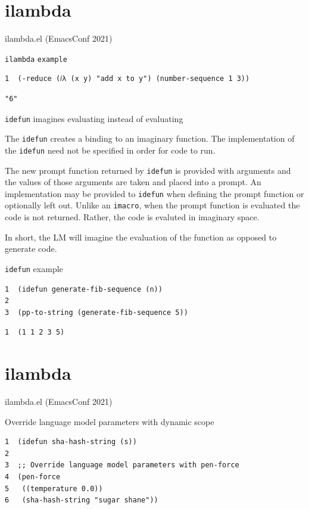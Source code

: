 \documentclass[presentation]{beamer}
\begin{document}
\section{ilambda}
\label{sec:org44c9bad}
\begin{frame}[label={sec:orga77398a},fragile]{ilambda.el (EmacsConf 2021)}
 \begin{block}{\texttt{ilambda} \texttt{example}}
{\tiny
\begin{verbatim}
1  (-reduce (𝑖λ (x y) "add x to y") (number-sequence 1 3))
\end{verbatim}
}

{\tiny
\begin{verbatim}
"6"
\end{verbatim}
}
\end{block}

\begin{block}{\texttt{idefun} imagines evaluating instead of evaluating}
{\tiny
The \texttt{idefun} creates a binding to an imaginary
function. The implementation of the \texttt{idefun}
need not be specified in order for code to
run.

The new prompt function returned by \texttt{idefun} is provided with arguments and the
values of those arguments are taken and placed
into a prompt. An implementation may be
provided to \texttt{idefun} when defining the prompt function or optionally left out.
Unlike an \texttt{imacro}, when the prompt function
is evaluated the code is not returned. Rather,
the code is evaluted in imaginary space.

In short, the LM will imagine the evaluation
of the function as opposed to generate code.
}
\end{block}

\begin{block}{\texttt{idefun} example}
{\tiny
\begin{verbatim}
1  (idefun generate-fib-sequence (n))
2  
3  (pp-to-string (generate-fib-sequence 5))
\end{verbatim}
}

{\tiny
\begin{verbatim}
1  (1 1 2 3 5)
\end{verbatim}
}
\end{block}
\end{frame}

\section{ilambda}
\label{sec:orgc007f51}
\begin{frame}[label={sec:org8780ad9},fragile]{ilambda.el (EmacsConf 2021)}
 \begin{block}{Override language model parameters with dynamic scope}
\begin{verbatim}
1  (idefun sha-hash-string (s))
2  
3  ;; Override language model parameters with pen-force
4  (pen-force
5   ((temperature 0.0))
6   (sha-hash-string "sugar shane"))
\end{verbatim}
\end{block}
\end{frame}
\end{document}
